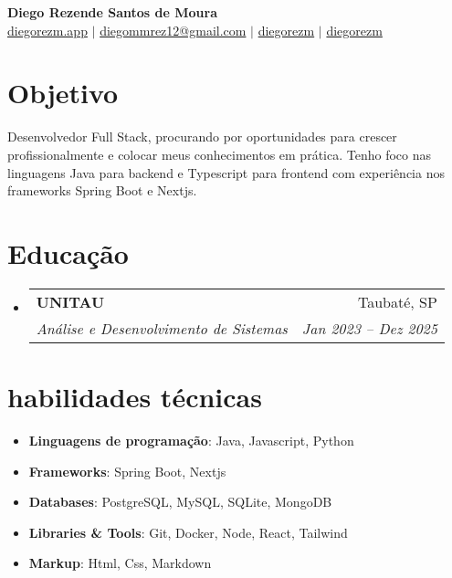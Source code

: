 \documentclass[letterpaper,10pt]{article}
\makeatletter
\newcommand{\resumeItem}[1]{\item\small{#1}}
\newcommand{\resumeSubheading}[4]{
\vspace{-1pt}\item
  \begin{tabular*}{0.97\textwidth}[t]{l@{\extracolsep{\fill}}r}
    \textbf{#1} & #2 \\
    \textit{#3} & \textit{#4} \\
  \end{tabular*}\vspace{-7pt}
}
\newcommand{\resumeSubHeadingList}{\begin{itemize}[leftmargin=0.15in, label={}]}
\newcommand{\resumeSubHeadingListEnd}{\end{itemize}}
\makeatother
\begin{document}
\begin{center}
  \textbf{\Huge Diego Rezende Santos de Moura} \\
  \small
  \faLink \hspace{0.01cm} \href{https://diegorezm.netlify.app/}{diegorezm.app} $|$ 
  \faEnvelope \hspace{0.001cm} \href{mailto:diegommrez12@gmail.com}{diegommrez12@gmail.com} $|$ 
  \faLinkedin \hspace{0.001cm} \href{https://linkedin.com/in/diegorezm}{diegorezm} $|$
  \faGithub \hspace{0.001cm} \href{https://github.com/diegorezm}{diegorezm}
\end{center}

\section*{Objetivo}
Desenvolvedor Full Stack, procurando por oportunidades para crescer profissionalmente e colocar meus conhecimentos em prática. Tenho foco nas linguagens Java para backend e Typescript para frontend com experiência nos frameworks Spring Boot e Nextjs.

\section{Educação}
\resumeSubHeadingList
  \resumeSubheading
      {UNITAU}{Taubaté, SP}
      {Análise e Desenvolvimento de Sistemas} {Jan 2023 -- Dez 2025}
\resumeSubHeadingListEnd
\section{habilidades técnicas}
\resumeSubHeadingList
  \resumeItem{\textbf{Linguagens de programação}: Java, Javascript, Python}
  \resumeItem{\textbf{Frameworks}: Spring Boot, Nextjs}
  \resumeItem{\textbf{Databases}: PostgreSQL, MySQL, SQLite, MongoDB}
  \resumeItem{\textbf{Libraries \& Tools}: Git, Docker, Node, React, Tailwind}
   \resumeItem{\textbf{Markup}: Html, Css, Markdown}
\resumeSubHeadingListEnd
\end{document}
